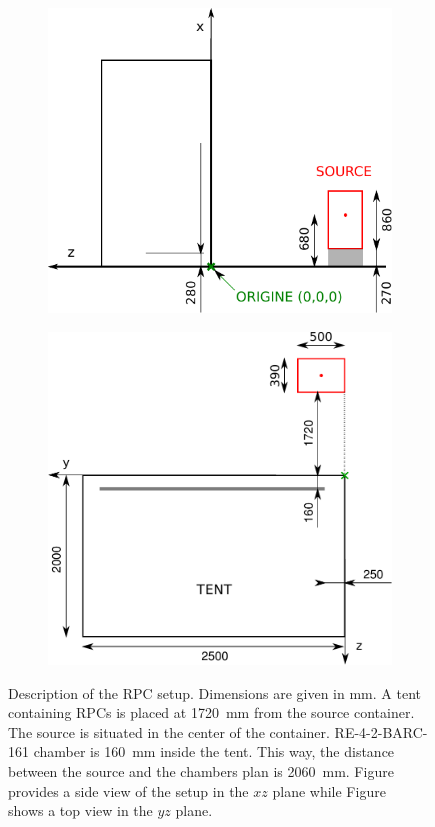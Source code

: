 	\begin{figure}[H]
		\begin{subfigure}{0.5\linewidth}
		    \centering
			\includegraphics[width = .8\linewidth]{fig/chapt5/GIF-Setup-A.pdf}
			\caption{\label{fig:GIFSetup:A}}
		\end{subfigure}
		\begin{subfigure}{0.5\linewidth}
		    \centering
			\includegraphics[width = .8\linewidth]{fig/chapt5/GIF-Setup-B.pdf}
			\caption{\label{fig:GIFSetup:B}}
		\end{subfigure}
		\caption{\label{fig:GIFSetup} Description of the RPC setup. Dimensions are given in \si{mm}. A tent containing RPCs is placed at \SI{1720}{mm} from the source container. The source is situated in the center of the container. RE-4-2-BARC-161 chamber is \SI{160}{mm} inside the tent. This way, the distance between the source and the chambers plan is \SI{2060}{mm}. Figure~ provides a side view of the setup in the $xz$ plane while Figure~ shows a top view in the $yz$ plane.}
	\end{figure}
	
